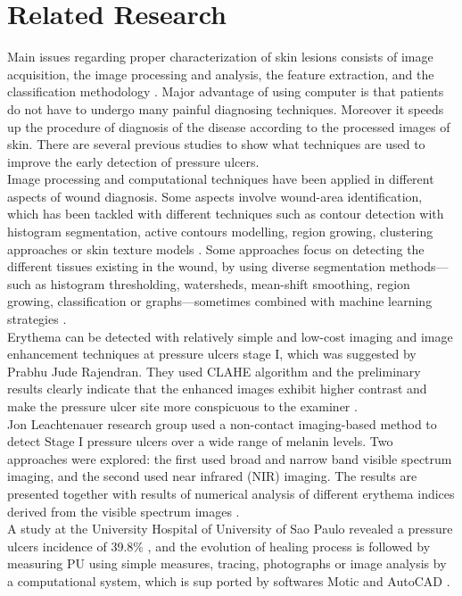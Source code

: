 \section{Related Research}
Main issues regarding proper characterization of skin lesions consists of image acquisition, the image processing and analysis, the feature extraction, and the classification methodology \cite{Patel}. Major advantage of using computer is that patients do not have to undergo many painful diagnosing techniques. Moreover it speeds up the procedure of diagnosis of the disease according to the processed images of skin. There are several previous studies to show what techniques are used to improve the early detection of pressure ulcers.\\
\indent Image processing and computational techniques have been applied in different aspects of wound diagnosis. Some aspects involve wound-area identification, which has been tackled with different techniques such as contour detection with
histogram segmentation, active contours modelling, region growing, clustering approaches or skin texture models \cite{Cula} \cite{Jones} \cite{Karkanis}. Some approaches focus on
detecting the different tissues existing in the wound, by using diverse segmentation methods—such as histogram thresholding, watersheds, mean-shift smoothing, region growing, classification or graphs—sometimes combined with machine learning strategies \cite{Kosmopoulos} \cite{Veredas} \cite{Wannous} \cite{Treuillet}.\\
\indent Erythema can be detected with relatively simple and low-cost imaging and image enhancement techniques at pressure ulcers stage I, which was suggested by Prabhu Jude Rajendran. They used CLAHE algorithm and the preliminary results clearly indicate that the enhanced images exhibit higher contrast and make the pressure ulcer site more conspicuous to the examiner \cite{Rajendran}.\\
\indent Jon Leachtenauer research group used a non-contact imaging-based method to detect Stage I pressure ulcers over a wide range of melanin levels. Two approaches were explored: the first used broad and narrow band visible spectrum imaging, and the second used near infrared (NIR) imaging. The results are presented together with results of numerical analysis of different erythema indices derived from the visible spectrum images \cite{Leachtenauer}. \\
\indent A study at the University Hospital of University of Sao Paulo revealed a pressure ulcers incidence of 39.8\% \cite{Rogenski}, and the evolution of healing process is followed by measuring PU using simple measures, tracing, photographs or image analysis by a computational system, which is sup ported by softwares Motic and AutoCAD \cite{minister}.\\
